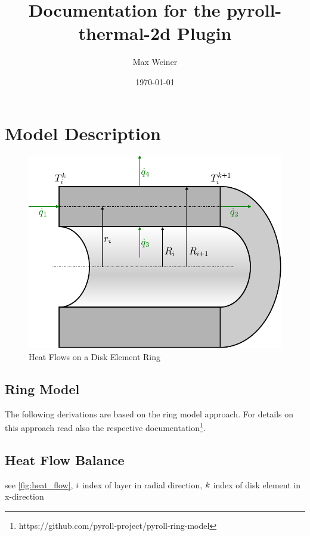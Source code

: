 \documentclass{scrartcl}
\begin{document}
    \title{Documentation for the pyroll-thermal-2d Plugin}
    \author{Max Weiner}
    \date{\today}

    \maketitle


    \section{Model Description}\label{sec:model-description}

    \begin{figure}
        \centering
        \includegraphics[scale=0.8]{img/heat_flow}
        \caption{Heat Flows on a Disk Element Ring}
        \label{fig:heat_flow}
    \end{figure}

    \subsection{Ring Model}

    The following derivations are based on the ring model approach.
    For details on this approach read also the respective documentation\footnote{https://github.com/pyroll-project/pyroll-ring-model}.

    \subsection{Heat Flow Balance}

    see \autoref{fig:heat_flow}, ${i}$ index of layer in radial direction, ${k}$ index of disk element in x-direction
\end{document}
